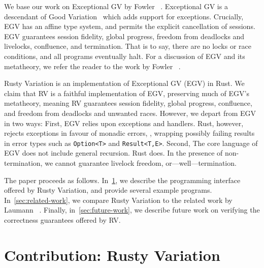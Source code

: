 \documentclass[copyright,creativecommons]{eptcs}
\begin{document}
We base our work on Exceptional GV by Fowler \etal~\cite[EGV]{fowler2019}. Exceptional GV is a descendant of Good Variation~\cite[GV]{wadler2012} which adds support for exceptions. Crucially, EGV has an affine type system, and permits the explicit cancellation of sessions. EGV guarantees session fidelity, global progress, freedom from deadlocks and livelocks, confluence, and termination. That is to say, there are no locks or race conditions, and all programs eventually halt. For a discussion of EGV and its metatheory, we refer the reader to the work by Fowler \etal~\cite{fowler2019}.

Rusty Variation is an implementation of Exceptional GV (EGV) in Rust. We claim that RV is a faithful implementation of EGV, preserving much of EGV's metatheory, meaning RV guarantees session fidelity, global progress, confluence, and freedom from deadlocks and unwanted races. However, we depart from EGV in two ways:
First, EGV relies upon exceptions and handlers. Rust, however, rejects exceptions in favour of monadic errors, \ie, wrapping possibly failing results in error types such as \lstinline{Option<T>} and \lstinline{Result<T,E>}.
Second, The core language of EGV does not include general recursion. Rust does. In the presence of non-termination, we cannot guarantee livelock freedom, or---well---termination.

The paper proceeds as follows. In~\cref{sec:contribution}, we describe the programming interface offered by Rusty Variation, and provide several example programs. In~\cref{sec:related-work}, we compare Rusty Variation to the related work by Laumann \etal~\cite{jespersen2015}. Finally, in~\cref{sec:future-work}, we describe future work on verifying the correctness guarantees offered by RV.

\section{Contribution: Rusty Variation}\label{sec:contribution}
\end{document}
